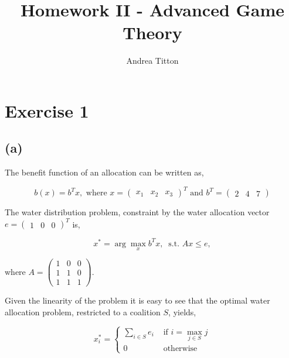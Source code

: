 \documentclass[american]{scrartcl}
\title{Homework II - Advanced Game Theory }
\author{Andrea Titton}
\begin{document}

\maketitle

\section*{Exercise 1}

\subsection*{(a)}

The benefit function of an allocation can be written as,

\begin{equation}
    b(x) = b^T x, \text{ where } x = \begin{pmatrix}
        x_1 & x_2 & x_3
    \end{pmatrix}^T \text{ and }b^T = \begin{pmatrix}
        2 & 4 & 7
    \end{pmatrix}
\end{equation}

The water distribution problem, constraint by the water allocation vector $e = \begin{pmatrix} 1 & 0 & 0 \end{pmatrix}^T$ is,

\begin{equation}
    x^* = \arg\max_{x}  b^T x, \ \text{ s.t. } A x \leq e,
\end{equation}

where $A = \begin{pmatrix}
        1 & 0 & 0 \\
        1 & 1 & 0 \\
        1 & 1 & 1
    \end{pmatrix}$.

Given the linearity of the problem it is easy to see that the optimal water allocation problem, restricted to a coalition $S$, yields,

\begin{equation} \label{opt_all_river}
    x^*_i = \begin{cases}
        \sum_{i \in S} e_i & \text{ if } i = \max_{j \in S} j \\
        0                  & \text{ otherwise}
    \end{cases}
\end{equation}
\end{document}
